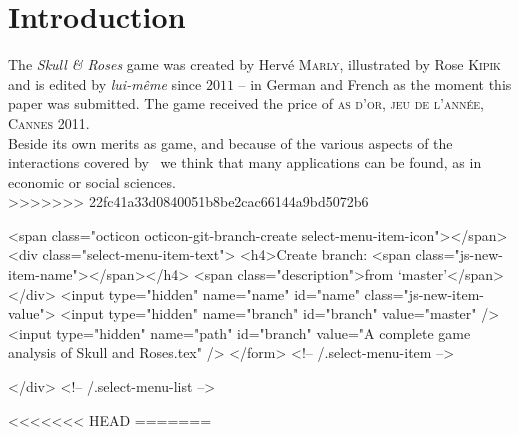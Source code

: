 %
\IEEEpeerreviewmaketitle



\section{Introduction}
The \emph{Skull \& Roses} game was created by Hervé \textsc{Marly}, illustrated by Rose \textsc{Kipik} and is edited by \emph{lui-même} since $2011$ -- in German and French as the moment this paper was submitted. The game received the price of \textsc{as d'or, jeu de l'année, Cannes 2011}.\\

Beside its own merits as game, and because of the various aspects of the interactions covered by \sr \ we think that many applications can be found, as in economic or social sciences.\\

 
>>>>>>> 22fc41a33d0840051b8be2cac66144a9bd5072b6

                <span class="octicon octicon-git-branch-create select-menu-item-icon"></span>
                <div class="select-menu-item-text">
                  <h4>Create branch: <span class="js-new-item-name"></span></h4>
                  <span class="description">from ‘master’</span>
                </div>
                <input type="hidden" name="name" id="name" class="js-new-item-value">
                <input type="hidden" name="branch" id="branch" value="master" />
                <input type="hidden" name="path" id="branch" value="A complete game analysis of Skull and Roses.tex" />
              </form> <!-- /.select-menu-item -->

          </div> <!-- /.select-menu-list -->

<<<<<<< HEAD
=======


